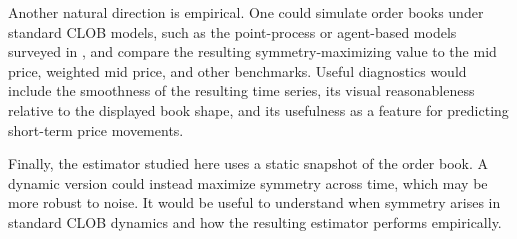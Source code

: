Another natural direction is empirical. One could simulate order books under
standard CLOB models, such as the point-process or agent-based models surveyed
in \cite{jain2024_limit_order_book_simulations_review}, and compare the resulting
symmetry-maximizing value to the mid price, weighted mid price, and other
benchmarks. Useful diagnostics would include the smoothness of the resulting
time series, its visual reasonableness relative to the displayed book shape, and
its usefulness as a feature for predicting short-term price movements.

Finally, the estimator studied here uses a static snapshot of the order book. A
dynamic version could instead maximize symmetry across time, which may be more
robust to noise. It would be useful to understand when symmetry arises in
standard CLOB dynamics and how the resulting estimator performs empirically.

